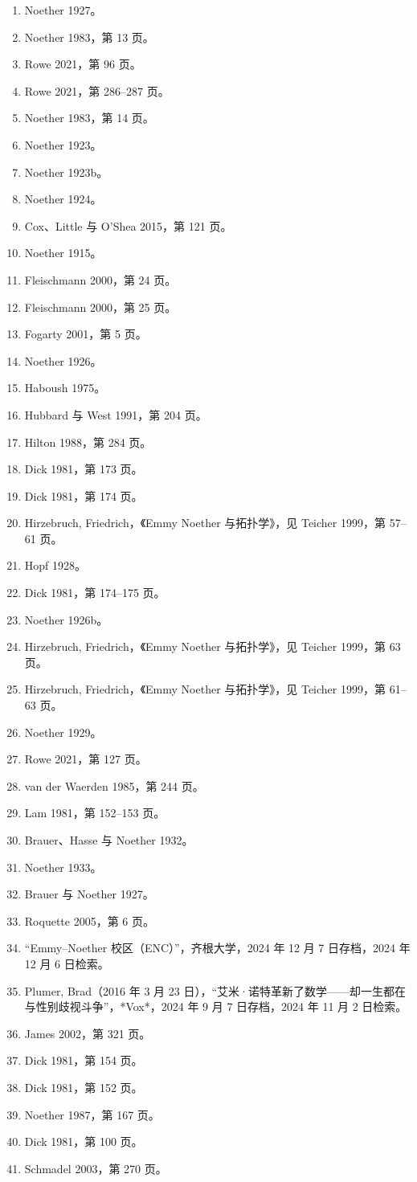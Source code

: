 \begin{enumerate}
\item Noether 1927。
\item Noether 1983，第 13 页。
\item Rowe 2021，第 96 页。
\item Rowe 2021，第 286–287 页。
\item Noether 1983，第 14 页。
\item Noether 1923。
\item Noether 1923b。
\item Noether 1924。
\item Cox、Little 与 O'Shea 2015，第 121 页。
\item Noether 1915。
\item Fleischmann 2000，第 24 页。
\item Fleischmann 2000，第 25 页。
\item Fogarty 2001，第 5 页。
\item Noether 1926。
\item Haboush 1975。
\item Hubbard 与 West 1991，第 204 页。
\item Hilton 1988，第 284 页。
\item Dick 1981，第 173 页。
\item Dick 1981，第 174 页。
\item Hirzebruch, Friedrich，《Emmy Noether 与拓扑学》，见 Teicher 1999，第 57–61 页。
\item Hopf 1928。
\item Dick 1981，第 174–175 页。
\item Noether 1926b。
\item Hirzebruch, Friedrich，《Emmy Noether 与拓扑学》，见 Teicher 1999，第 63 页。
\item Hirzebruch, Friedrich，《Emmy Noether 与拓扑学》，见 Teicher 1999，第 61–63 页。
\item Noether 1929。
\item Rowe 2021，第 127 页。
\item van der Waerden 1985，第 244 页。
\item Lam 1981，第 152–153 页。
\item Brauer、Hasse 与 Noether 1932。
\item Noether 1933。
\item Brauer 与 Noether 1927。
\item Roquette 2005，第 6 页。
\item “Emmy–Noether 校区（ENC）”，齐根大学，2024 年 12 月 7 日存档，2024 年 12 月 6 日检索。
\item Plumer, Brad（2016 年 3 月 23 日），“艾米·诺特革新了数学——却一生都在与性别歧视斗争”，*Vox*，2024 年 9 月 7 日存档，2024 年 11 月 2 日检索。
\item James 2002，第 321 页。
\item Dick 1981，第 154 页。
\item Dick 1981，第 152 页。
\item Noether 1987，第 167 页。
\item Dick 1981，第 100 页。
\item Schmadel 2003，第 270 页。
\end{enumerate}
